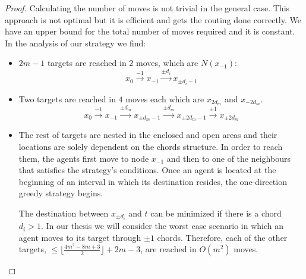\begin{proof}
Calculating the number of moves is not trivial in the general case. This approach is not optimal but it is efficient and gets the routing done correctly. We have an upper bound for the total number of moves required and it is constant. In the analysis of our strategy we find:
\begin{itemize}

\item $2m-1$ targets are reached in $2$ moves, which are $N(x_{-1})$:
$$ x_{0}\xrightarrow {-1}x_{-1} \xrightarrow {\pm d_i} x_{\pm d_i-1}$$

\item Two targets are reached in $4$ moves each which are  $x_{2d_m}$ and $x_{-2d_m}$.
$$ x_{0}\xrightarrow {-1}x_{-1} \xrightarrow {\pm d_m} x_{\pm d_m-1} \xrightarrow {\pm d_m} x_{\pm 2d_m-1}\xrightarrow {\pm 1} x_{\pm 2d_m}$$

\item The rest of targets are nested in the enclosed and open areas and their locations are solely dependent on the chords structure. 
In order to reach them, the agents first move to  node $x_{-1}$ and then to one of the neighbours that satisfies the strategy's conditions. Once an agent is located at the beginning of an interval in which its destination resides, the one-direction greedy strategy begins. 

 The destination between $x_{\pm d_i}$ and $t$ can be minimized if there is a chord $d_i>1$. In our thesis we will consider the worst case scenario in which an agent moves to its target through $\pm 1$ chords. Therefore, each of the other targets, $\leq \lfloor \frac {4m^2-8m+3}{2} \rfloor +2m-3$, are reached in  $O( m^2)$ moves.
\end{itemize}
\end{proof}





